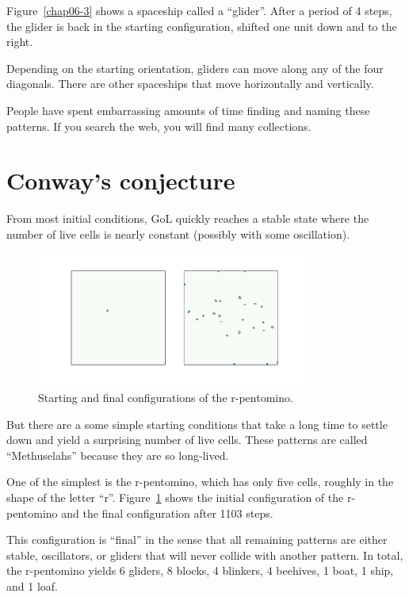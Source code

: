 \documentclass[12pt]{book}
\theoremstyle{exercise}
\begin{document}
Figure~\ref{chap06-3} shows a spaceship called a
``glider''.  After a period of 4 steps, the glider is back in the
starting configuration, shifted one unit down and to the right.


Depending on the starting orientation, gliders can move along any
of the four diagonals.  There are other spaceships that
move horizontally and vertically.

People have spent embarrassing
amounts of time finding and naming these patterns.  If you search
the web, you will find many collections.

\section{Conway's conjecture}

From most initial conditions, GoL quickly reaches a stable
state where the number of live cells is nearly constant
(possibly with some oscillation).

\begin{figure}
\centerline{\includegraphics[height=1.75in]{figs/chap06-4.pdf}}
\caption{Starting and final configurations of the r-pentomino.}
\label{chap06-4}
\end{figure}

But there are a some simple starting conditions that take a
long time to settle down and yield a surprising
number of live cells.  These patterns are called ``Methuselahs''
because they are so long-lived.


One of the simplest is the
r-pentomino, which has only five cells, roughly in the shape of the
letter ``r''.  Figure~\ref{chap06-4} shows the initial configuration
of the r-pentomino and the final configuration after 1103 steps.

This configuration is ``final'' in the sense that all remaining
patterns are either stable, oscillators, or gliders that will never
collide with another pattern.  In total, the r-pentomino yields 6
gliders, 8 blocks, 4 blinkers, 4 beehives, 1 boat, 1 ship, and 1 loaf.
\end{document}
